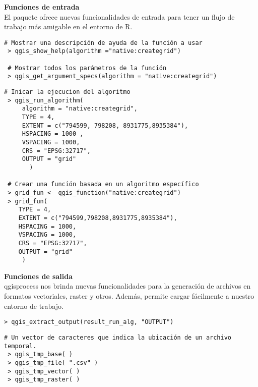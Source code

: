\documentclass{article}
\begin{document}
\begin{multicols*}{3}
\begin{minipage}{\linewidth}
  \vspace{-5pt}
   \textbf{\fontsize{44}{44}\selectfont \textbf{Funciones de entrada}}\vspace{8pt}\\ 
   El paquete ofrece nuevas funcionalidades de entrada para tener un flujo de trabajo más amigable en el entorno de R.
\end{minipage}
\begin{lstlisting}[style=Rstyle]
 # Mostrar una descripción de ayuda de la función a usar
 > qgis_show_help(algorithm ="native:creategrid")

 # Mostrar todos los parámetros de la función
 > qgis_get_argument_specs(algorithm = "native:creategrid")
\end{lstlisting}
\begin{lstlisting}[style=Rstyle]
 # Inicar la ejecucion del algoritmo
 > qgis_run_algorithm( 
     algorithm = "native:creategrid",
     TYPE = 4,
     EXTENT = c("794599, 798208, 8931775,8935384"),
     HSPACING = 1000 ,
     VSPACING = 1000,
     CRS = "EPSG:32717",
     OUTPUT = "grid"
       )

 # Crear una función basada en un algoritmo específico
 > grid_fun <- qgis_function("native:creategrid")
 > grid_fun(
    TYPE = 4,
    EXTENT = c("794599,798208,8931775,8935384"),
    HSPACING = 1000,
    VSPACING = 1000,
    CRS = "EPSG:32717",
    OUTPUT = "grid"
     )
\end{lstlisting}

\begin{minipage}{\linewidth}
  \vspace{12pt}
   \textbf{\fontsize{44}{44}\selectfont \textbf{Funciones de salida}}\vspace{8pt}\\ 
qgisprocess nos brinda nuevas funcionalidades para la generación de archivos en formatos vectoriales, raster y otros. Además, permite cargar fácilmente a nuestro entorno de trabajo.
\end{minipage}

\begin{lstlisting}[style=Rstyle]
 > qgis_extract_output(result_run_alg, "OUTPUT")
\end{lstlisting}
\begin{lstlisting}[style=Rstyle]
# Un vector de caracteres que indica la ubicación de un archivo temporal.
 > qgis_tmp_base( )
 > qgis_tmp_file( ".csv" )
 > qgis_tmp_vector( )
 > qgis_tmp_raster( )
\end{lstlisting}


\end{multicols*}
\end{document}
